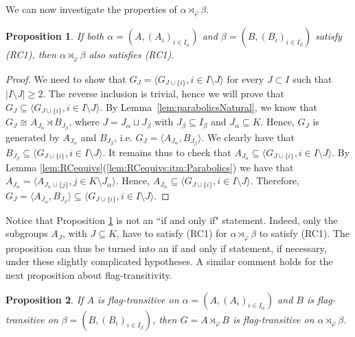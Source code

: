 \documentclass[11pt,letterpaper]{amsart}
\newtheorem{prop}{Proposition}[section]
\begin{document}
We can now investigate the properties of $\alpha \rtimes_\varphi \beta$.
\begin{prop}\label{prop:RCSemiDirect}
    If both $\alpha = (A,(A_i)_{i \in I_\alpha})$ and $\beta = (B,(B_i)_{i \in I_\beta})$ satisfy (RC1), then $\alpha \rtimes_\varphi \beta$ also satisfies (RC1).
\end{prop}
\begin{proof}
    We need to show that $G_J = \langle G_{J \cup \{i\}}, i \in I \setminus J \rangle$ for every $J \subset I$ such that $|I\setminus J|\geq 2$. 
    The reverse inclusion is trivial, hence we will prove that  $G_J \subseteq \langle G_{J \cup \{i\}}, i \in I \setminus J \rangle$.
    By Lemma~\ref{lem:parabolicsNatural}, we know that $G_J \cong A_{J_\alpha} \rtimes B_{J_\beta}$, where $J = J_\alpha \sqcup J_\beta$ with $J_\beta \subseteq I_\beta$ and $J_\alpha \subseteq K$. Hence, $G_J$ is generated by $A_{J_\alpha}$ and $B_{J_\beta}$, i.e. $G_J=\langle A_{J_\alpha}, B_{J_\beta}\rangle$. We clearly have that $B_{J_\beta} \subseteq \langle G_{J \cup \{i\}}, i \in I \setminus J \rangle$. It remains thus to check that $A_{J_\alpha} \subseteq \langle G_{J \cup \{i\}}, i \in I \setminus J \rangle$.
    By Lemma \ref{lem:RCequivs}(\ref{lem:RCequivs:itm:Parabolics}) we have that $A_{J_\alpha} = \langle A_{J_\alpha \cup \{j\}}, j \in K \setminus J_\alpha \rangle$. Hence, $A_{J_\alpha}\subseteq \langle G_{J \cup \{i\}}, i \in I \setminus J \rangle$. Therefore, $G_J = \langle A_{J_\alpha}, B_{J_\beta}\rangle \subseteq \langle G_{J \cup \{i\}}, i \in I \setminus J \rangle$.
\end{proof}
Notice that Proposition \ref{prop:RCSemiDirect} is not an ``if and only if" statement. Indeed, only the subgroups $A_{J}$, with $J \subseteq K$, have to satisfy (RC1) for $\alpha \rtimes_\varphi \beta$ to satisfy (RC1). The proposition can thus be turned into an if and only if statement, if necessary, under these slightly complicated hypotheses. A similar comment holds for the next proposition about flag-transitivity.
\begin{prop}\label{prop:semidir_FT}
If $A$ is flag-transitive on $\alpha = (A,(A_i)_{i \in I_\alpha})$ and $B$ is flag-transitive on $\beta = (B,(B_i)_{i \in I_\beta})$, then $G = A \rtimes_\varphi B$ is flag-transitive on $\alpha \rtimes_\varphi \beta$.
\end{prop}
\end{document}
